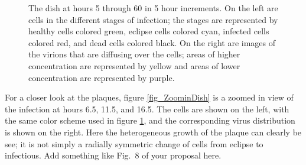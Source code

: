 \begin{figure}
\begin{minipage}{0.8\linewidth}
\begin{multicols}{2}
\end{multicols}
\end{minipage}
\caption{The dish at hours 5 through 60 in 5 hour increments. On the left are cells in the different stages of infection; the stages are represented by healthy cells colored green, eclipse cells colored cyan, infected cells colored red, and dead cells colored black. On the right are images of the virions that are diffusing over the cells; areas of higher concentration are represented by yellow and areas of lower concentration are represented by purple. \label{fig_FullDish_cellandvirus}}
\end{figure}

For a closer look at the plaques, figure \ref{fig_ZoominDish} is a zoomed in view of the infection at hours 6.5, 11.5, and 16.5. The cells are shown on the left, with the same color scheme used in figure \ref{fig_FullDish_cellandvirus}, and the corresponding virus distribution is shown on the right. Here the heterogeneous growth of the plaque can clearly be see; it is not simply a radially symmetric change of cells from eclipse to infectious. \color{red} Add something like Fig.\ 8 of your proposal here. \color{black} 

